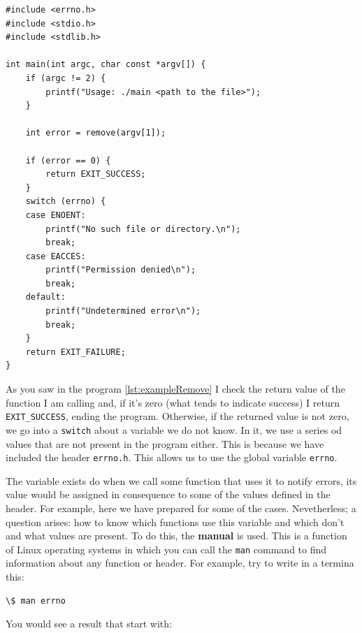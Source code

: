 \documentclass[a4paper]{article}
\begin{document}
\noindent
\begin{minipage}[H]{\linewidth}
\mbox{}
\begin{lstlisting}[style=C,
caption={Ejemplo de programa que usa la variable \texttt{errno}},
label={lst:exampleRemove2}]
#include <errno.h>
#include <stdio.h>
#include <stdlib.h>

int main(int argc, char const *argv[]) {
    if (argc != 2) {
        printf("Usage: ./main <path to the file>");
    }

    int error = remove(argv[1]);

    if (error == 0) {
        return EXIT_SUCCESS;
    }
    switch (errno) {
    case ENOENT:
        printf("No such file or directory.\n");
        break;
    case EACCES:
        printf("Permission denied\n");
        break;
    default:
        printf("Undetermined error\n");
        break;
    }
    return EXIT_FAILURE;
}
\end{lstlisting}
\end{minipage}

As you saw in the program \ref{lst:exampleRemove} I check the return value of
the function I am calling and, if it's zero (what tends to indicate success)
I return \verb!EXIT_SUCCESS!, ending the program. Otherwise, if the returned
value is not zero, we go into a \verb"switch" about a variable we do not know.
In it, we use a series od values that are not present in the program either.
This is because we have included the header \verb!errno.h!. This allows us to
use the global variable \verb!errno!.

The variable exists do when we call some function that uses it to notify errors,
its value would be assigned in consequence to some of the values defined in the
header. For example, here we have prepared for some of the cases. Nevetherless;
a question arises: how to know which functions use this variable and which don't
and what values are present. To do this, the \textbf{manual} is used. This is a
function of Linux operating systems in which you can call the \verb!man! command
to find information about any function or header. For example, try to write in
a termina this:

\noindent
\begin{minipage}[H]{\linewidth}
\mbox{}
\begin{lstlisting}[style=terminalStyle]
\$ man errno
\end{lstlisting}
\end{minipage}

You would see a result that start with:
\end{document}
